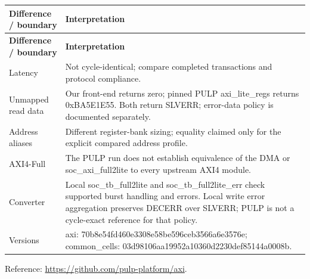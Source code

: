 \documentclass[11pt]{article}
\begin{document}
{\small
\begin{longtable}{@{}L{0.2500\dimexpr\linewidth-12pt\relax}L{0.7500\dimexpr\linewidth-12pt\relax}@{}}
\toprule
\textbf{Difference / boundary} & \textbf{Interpretation} \\ \midrule
\endfirsthead
\toprule
\textbf{Difference / boundary} & \textbf{Interpretation} \\ \midrule
\endhead
Latency & Not cycle-identical; compare completed transactions and protocol compliance. \\ \addlinespace[3pt]
Unmapped read data & Our front-end returns zero; pinned PULP axi\_lite\_regs returns 0xBA5E1E55. Both return SLVERR; error-data policy is documented separately. \\ \addlinespace[3pt]
Address aliases & Different register-bank sizing; equality claimed only for the explicit compared address profile. \\ \addlinespace[3pt]
AXI4-Full & The PULP run does not establish equivalence of the DMA or soc\_axi\_full2lite to every upstream AXI4 module. \\ \addlinespace[3pt]
Converter & Local soc\_tb\_full2lite and soc\_tb\_full2lite\_err check supported burst handling and errors. Local write error aggregation preserves DECERR over SLVERR; PULP is not a cycle-exact reference for that policy. \\ \addlinespace[3pt]
Versions & axi: 70b8e54fd460e3308e58be596ceb3566a6e3576e; common\_cells: 03d98106aa19952a10360d2230def85144a0008b. \\*
\bottomrule\end{longtable}}
\noindent Reference: \url{https://github.com/pulp-platform/axi}.
\end{document}
